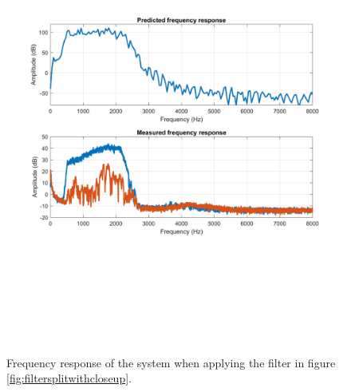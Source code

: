 \begin{figure}[H]
\centering
\includegraphics[width=15cm,height=15cm,keepaspectratio]
{Figures/fftbaccsplit}
\decoRule
\caption[Frequency response]{Frequency response of the system when applying the filter in figure \ref{fig:filtersplitwithcloseup}.}
\label{fig:welchfiltersplit}
\end{figure}

